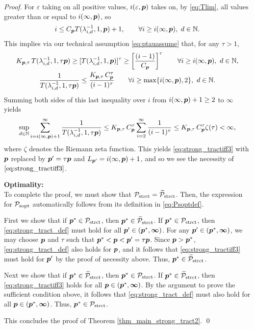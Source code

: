 \documentclass[sort&compress]{elsarticle}
\newcommand{\vinfty}{\boldsymbol{\infty}}
\begin{document}
\begin{proof}
For $\varepsilon$ taking on all positive values, $i(\varepsilon,\boldsymbol{p})$ takes on, by \eqref{eq:Tlim}, all values greater than or equal to $i(\infty,\boldsymbol{p})$, so
\[
i\le C_{\boldsymbol{p}} T(\lambda_{i,d}^{-1},1,\boldsymbol{p})+1, \qquad \forall i \ge i(\infty,\boldsymbol{p}), \ d \in \mathbb{N}.
\]
This implies via our technical assumption \eqref{eq:ptauassume} that, for any $\tau>1$,
\begin{gather*}
 K_{\boldsymbol{p},\tau}\,T (\lambda_{i,d}^{-1},1,\tau \boldsymbol{p}) \ge
 [T(\lambda_{i,d}^{-1},1, \boldsymbol{p})]^\tau
 \ge
  \left[\frac{(i-1)}{C_{\boldsymbol{p}}}\right]^\tau \qquad \forall i \ge i(\infty,\boldsymbol{p}), \ d \in \mathbb{N}, \\
 \frac{1}{T (\lambda_{i,d}^{-1},1,\tau \boldsymbol{p})} \le
\frac{K_{\boldsymbol{p},\tau}\, C_{\boldsymbol{p}}^\tau}{(i-1)^\tau}\qquad \forall i \ge \max\{i(\infty,\boldsymbol{p}),2\}, \ d \in \mathbb{N} .
\end{gather*}
Summing both sides of this last inequality over $i$ from $i(\infty,\boldsymbol{p}) +1 \ge 2$ to $\vinfty$ yields
\begin{equation*}
\sup_{d\in\mathbb{N}} \sum_{i=i(\infty,\boldsymbol{p}) +1 }^\infty \frac{1}{T (\lambda_{i,d}^{-1},1, \tau \boldsymbol{p})}
 \le  K_{\boldsymbol{p},\tau}\, C_{\boldsymbol{p}}^\tau
\sum_{i=2}^\infty \frac{1}{(i-1)^\tau} \\
 \le K_{\boldsymbol{p},\tau}\, C_{\boldsymbol{p}}^\tau
\zeta (\tau)  < \infty,
\end{equation*}
where $\zeta$ denotes the Riemann zeta function.
This yields \eqref{eq:strong_tractiff3} with $\boldsymbol{p}$ replaced by $\boldsymbol{p}' = \tau \boldsymbol{p}$ and $L_{\boldsymbol{p}'} = i(\infty,\boldsymbol{p}) +1$, and so we see the necessity of $\eqref{eq:strong_tractiff3}$.

\bigskip
\noindent \textbf{Optimality:} \\
To complete the proof, we must show that $\mathcal{P}_{\textup{strct}} = \widetilde{\mathcal{P}}_{\textup{strct}}$.  Then, the expression for  $\mathcal{P}_{\textup{sopt}}$ automatically follows from its definition in \eqref{eq:Psoptdef}.

First we show  that if $\boldsymbol{p}^* \in \mathcal{P}_{\textup{strct}}$, then $\boldsymbol{p}^* \in \widetilde{\mathcal{P}}_{\textup{strct}}$.  If $\boldsymbol{p}^* \in \mathcal{P}_{\textup{strct}}$, then \eqref{eq:strong_tract_def} must hold for all $\vp' \in (\vp^*,\vinfty)$.  For any $\vp' \in (\vp^*,\vinfty)$, we may choose $\boldsymbol{p}$ and $\tau$ such that $\boldsymbol{p}^* < \boldsymbol{p} < \boldsymbol{p}' = \tau \boldsymbol{p}$. Since $\boldsymbol{p} > \boldsymbol{p}^*$, \eqref{eq:strong_tract_def} also holds for $\boldsymbol{p}$, and it follows that \eqref{eq:strong_tractiff3} must hold for $\boldsymbol{p}'$ by the proof of necessity above.  Thus, $\boldsymbol{p}^* \in \widetilde{\mathcal{P}}_{\textup{strct}}$.

Next we show that if $\boldsymbol{p}^* \in \widetilde{\mathcal{P}}_{\textup{strct}}$, then $\boldsymbol{p}^* \in \mathcal{P}_{\textup{strct}}$.  If $\boldsymbol{p}^* \in \widetilde{\mathcal{P}}_{\textup{strct}}$, then \eqref{eq:strong_tractiff3}  holds for all $\vp \in (\vp^*,\vinfty)$.  By the argument to prove the sufficient condition above, it follows that \eqref{eq:strong_tract_def} must also hold for all $\vp \in (\vp^*,\vinfty)$. Thus, $\boldsymbol{p}^* \in \mathcal{P}_{\textup{strct}}$.

\bigskip

\noindent This concludes the proof of  Theorem \ref{thm_main_strong_tract2}. \qed

\end{proof}
\end{document}
